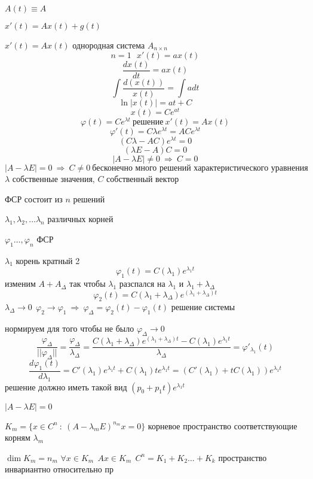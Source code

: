 \begin{define}
  $A(t) \equiv A$

  $x'(t) = Ax(t) + g(t)$

  $x'(t) = Ax(t)$ однородная система $A_{n\times n}$
  $$
  n=1 ~~~ x'(t) = ax(t)
  $$
  $$
  \frac{dx(t)}{dt} = ax(t)
  $$
  $$
  \int \frac{d(x(t))}{x(t)} = \int a dt
  $$
  $$
  \ln |x(t)| = at + C
  $$
  $$
  x(t) = Ce^{at}
  $$
  $$
  \varphi(t) = Ce^{\lambda t} ~ \text{решение} ~ x'(t) = Ax(t)
  $$
  $$
  \varphi'(t) = C \lambda e^{\lambda t} = ACe^{\lambda t}
  $$
  $$
  (C\lambda - AC)e^{\lambda t} = 0
  $$
  $$
  (\lambda E - A)C = 0
  $$
  $$
  |A - \lambda E| \not= 0 ~ \Rightarrow ~ C = 0
  $$
  $$
  |A - \lambda E| = 0 ~ \Rightarrow ~ C \not= 0 ~ \text{бесконечно много
  решений характеристического уравнения}
  $$
  $\lambda$ собственные значения, $C$ собственный вектор

  ФСР состоит из $n$ решений

  $\lambda_1, \lambda_2, \ldots \lambda_n$ различных корней

  $\varphi_1 \ldots, \varphi_n$ ФСР

  $\lambda_1$ корень кратный 2
  $$
  \varphi_1(t) = C(\lambda_1) e^{\lambda_1 t}
  $$
  изменим $A + A_{\Delta}$ так чтобы $\lambda_1$ разспался на $\lambda_1$ и
  $\lambda_1 + \lambda_{\Delta}$
  $$
  \varphi_2(t) = C(\lambda_1 + \lambda_{\Delta})e^{(\lambda_1 +
  \lambda_{\Delta})t}
  $$
  $\lambda_{\Delta} \to 0 ~~ \varphi_2 \to \varphi_1 ~ \Rightarrow ~
  \varphi_{\Delta} = \varphi_2(t) - \varphi_1(t)$ решение системы

  нормируем для того чтобы не было $\varphi_{\Delta} \to 0$
  $$
  \frac{\varphi_{\Delta}}{||\varphi_{\Delta}||} =
  \frac{\varphi_{\Delta}}{\lambda_{\Delta}} =
  \frac{C(\lambda_1 + \lambda_{\Delta})e^{(\lambda_1 + \lambda_{\Delta})t} -
  C(\lambda_1)e^{\lambda_1 t}}{\lambda_{\Delta}} = \varphi'_{\lambda_1}(t)
  $$
  $$
  \frac{d \varphi_1(t)}{d\lambda_1} = C'(\lambda_1)e^{\lambda_1 t} +
  C(\lambda_1)t e^{\lambda_1 t} = (C'(\lambda_1) + t C(\lambda_1))
  e^{\lambda_1 t}
  $$
  решение должно иметь такой вид $(p_0 + p_1 t) e^{\lambda_1 t}$

  $|A - \lambda E| = 0$

  $K_m = \{x \in C^n ~ : ~ (A - \lambda_m E)^{n_m} x = 0\}$ корневое
  пространство соответствующие корням $\lambda_m$

  $\dim K_m = n_m$ $\forall x \in K_m ~~ Ax \in K_m ~~ C^n = K_1 + K_2 \ldots
  + K_k$ пространство инвариантно относительно пр
\end{define}

